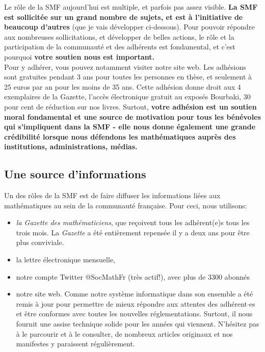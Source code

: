 Le r\^{o}le de la SMF aujourd'hui est multiple, et parfois pas assez visible. {\bf La SMF est sollicit\'ee sur un grand nombre de sujets, et est \`a l'initiative de beaucoup d'autres} (que je vais d\'evelopper ci-dessous). Pour pouvoir r\'epondre aux nombreuses sollicitations, et d\'evelopper de belles actions, le r\^ole et la participation de la communaut\'e et des adh\'erents est fondamental, et c'est pourquoi {\bf votre soutien nous est important.}
\\Pour y adh\'erer, vous pouvez notamment visiter notre site web. Les adh\'esions sont gratuites pendant 3 ans pour toutes les personnes en th\`ese, et seulement \`a 25 euros par an pour les moins de 35 ans. Cette adh\'esion donne droit aux 4 exemplaires de la Gazette, l’acc\`es \'electronique gratuit au expos\'es Bourbaki, 30 pour cent de r\'eduction sur nos livres. Surtout, {\bf votre adh\'esion est un soutien moral fondamental et une source de motivation pour tous les b\'en\'evoles qui s’impliquent dans la SMF - elle nous donne \'egalement une grande cr\'edibilit\'e lorsque nous d\'efendons les math\'ematiques aupr\`es des institutions, administrations, m\'edias.}


\subsection{Une source d'informations}

 Un des r\^oles de la SMF est de faire diffuser les informations li\'ees aux math\'ematiques au sein de la communaut\'e fran\c caise. Pour ceci, nous utilisons:
 \begin{itemize}
 \item  \emph{la Gazette des math\'{e}\-maticiens}, que re\c{c}oivent tous les adh\'{e}rent(e)s tous les trois mois. La {\em Gazette} a \'et\'e enti\`erement repens\'ee il y a deux ans pour \^etre plus conviviale.
 \item la lettre \'{e}lectronique mensuelle, 
 \item notre compte Twitter @SocMathFr (tr\`es actif!), avec plus de 3300 abonn\'es\
 \item notre site web. Comme notre syst\`eme informatique dans son ensemble a \'et\'e remis \`a jour pour permettre de mieux r\'epondre aux attentes des adh\'erent$\cdot$es et \^etre conformes avec toutes les nouvelles r\'eglementations. Surtout, il nous fournit une assise technique solide pour les ann\'ees qui viennent. N’h\'esitez pas \`a le parcourir et \`a le consulter, de nombreux articles originaux et nos manifestes y paraissent r\'eguli\`erement.
\end{itemize}

